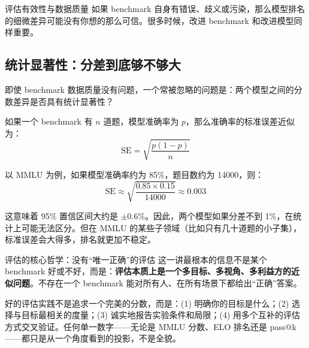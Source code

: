 \begin{knowledgebox}{评估有效性与数据质量}
如果 benchmark 自身有错误、歧义或污染，那么模型排名的细微差异可能没有你想的那么可信。很多时候，改进 benchmark 和改进模型同样重要。
\end{knowledgebox}

\subsection{统计显著性：分差到底够不够大}

即使 benchmark 数据质量没有问题，一个常被忽略的问题是：两个模型之间的分数差异是否具有统计显著性？

如果一个 benchmark 有 $n$ 道题，模型准确率为 $p$，那么准确率的标准误差近似为：
\[
\mathrm{SE} = \sqrt{\frac{p(1-p)}{n}}
\]

以 MMLU 为例，如果模型准确率约为 85\%，题目数约为 14000，则：
\[
\mathrm{SE} \approx \sqrt{\frac{0.85 \times 0.15}{14000}} \approx 0.003
\]

这意味着 95\% 置信区间大约是 $\pm 0.6\%$。因此，两个模型如果分差不到 1\%，在统计上可能无法区分。但在 MMLU 的某些子领域（比如只有几十道题的小子集），标准误差会大得多，排名就更加不稳定。

\begin{importantbox}{评估的核心哲学：没有``唯一正确''的评估}
这一讲最根本的信息不是某个 benchmark 好或不好，而是：\textbf{评估本质上是一个多目标、多视角、多利益方的近似问题}。不存在一个 benchmark 能对所有人、在所有场景下都给出``正确''答案。

好的评估实践不是追求一个完美的分数，而是：(1) 明确你的目标是什么；(2) 选择与目标最相关的度量；(3) 诚实地报告实验条件和局限；(4) 用多个互补的评估方式交叉验证。任何单一数字——无论是 MMLU 分数、ELO 排名还是 pass@k——都只是从一个角度看到的投影，不是全貌。
\end{importantbox}

